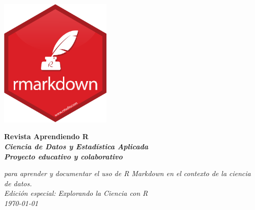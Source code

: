 \begin{center}
  \includegraphics[width=0.4\textwidth]{img/logo.png}\par\vspace{1cm}

  \Huge\bfseries Revista Aprendiendo R \\
  \vspace{0.5cm}
  \Large\itshape Ciencia de Datos y Estadística Aplicada \\[2cm]
  
  \Huge\bfseries Proyecto educativo y colaborativo \par
  \Large\itshape para aprender y documentar el uso de R Markdown en el contexto de la ciencia de datos. \\[4cm]

  \textit{Edición especial: Explorando la Ciencia con R} \\[0.5cm]
  \today
\end{center}

\clearpage

\setlength{\columnsep}{1cm} %
\setlength{\columnseprule}{0pt} %
